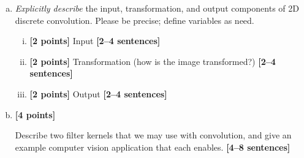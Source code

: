 \documentclass[11pt]{article}
\begin{document}
\begin{enumerate}[(a)]
\item 
\begin{tcolorbox}[colback=orange!5!white,colframe=orange!75!black]
\emph{Explicitly describe} the input, transformation, and output components of 2D discrete convolution. Please be precise; define variables as need.
\end{tcolorbox}
\begin{enumerate}[(i)]
    \item \textbf{[2 points]} Input \textbf{[2--4 sentences]}
    
    \item \textbf{[2 points]} Transformation (how is the image transformed?) \textbf{[2--4 sentences]} 
    
\pagebreak

    \item \textbf{[2 points]} Output \textbf{[2--4 sentences]}
    
\end{enumerate}


\item \textbf{[4 points]}
\begin{tcolorbox}[colback=orange!5!white,colframe=orange!75!black]
Describe two filter kernels that we may use with convolution, and give an example computer vision application that each enables. \textbf{[4--8 sentences]}
\end{tcolorbox}


\end{enumerate}
\end{document}
